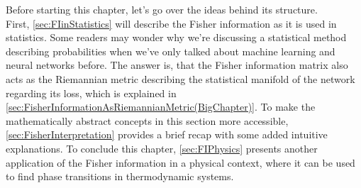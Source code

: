 Before starting this chapter, let's go over the ideas behind its structure.\\
First, \cref{sec:FIinStatistics} will describe the Fisher information as it is used in statistics. Some readers may wonder why we're discussing a statistical method describing probabilities when we've only talked about machine learning and neural networks before. The answer is, that the Fisher information matrix also
acts as the Riemannian metric describing the statistical manifold of the network regarding its loss, which is explained in \cref{sec:FisherInformationAsRiemannianMetric(BigChapter)}. To make the mathematically abstract concepts in this section more accessible, \cref{sec:FisherInterpretation} provides a brief recap with some added intuitive explanations. To conclude this chapter, \cref{sec:FIPhysics} presents another application of the Fisher information in a physical context, where it can be used to find phase transitions in thermodynamic systems.